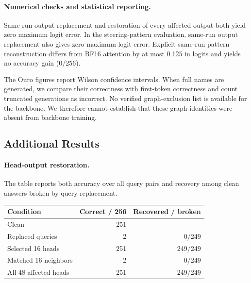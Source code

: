 \documentclass{article}
\begin{document}
\paragraph{Numerical checks and statistical reporting.}
Same-run output replacement and restoration of every affected output both yield zero maximum logit error. In the steering-pattern evaluation, same-run output replacement also gives zero maximum logit error. Explicit same-run pattern reconstruction differs from BF16 attention by at most 0.125 in logits and yields no accuracy gain (0/256).

The Ouro figures report Wilson confidence intervals. When full names are generated, we compare their correctness with first-token correctness and count truncated generations as incorrect. No verified graph-exclusion list is available for the backbone. We therefore cannot establish that these graph identities were absent from backbone training.

\subsection{Additional Results}
\label{app:ouro-results}

\paragraph{Head-output restoration.}
The table reports both accuracy over all query pairs and recovery among clean answers broken by query replacement.
\begin{center}\begin{minipage}{\linewidth}\centering\centering
\captionsetup{hypcap=false}
\begin{tabular}{@{}lrr@{}}\toprule
Condition & Correct / 256 & Recovered / broken\\\midrule
Clean & 251 & --- \\
Replaced queries & 2 & 0/249 \\
Selected 16 heads & 251 & 249/249 \\
Matched 16 neighbors & 2 & 0/249 \\
All 48 affected heads & 251 & 249/249 \\
\bottomrule\end{tabular}\end{minipage}\end{center}
\end{document}
